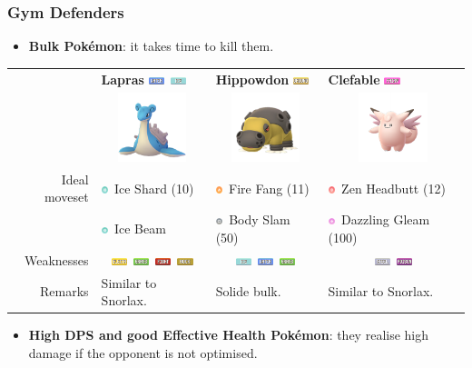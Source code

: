 \documentclass[12pt]{beamer}
\newcommand{\fightingfull}{\includegraphics[height=0.2cm]{../../images/type/full/Fighting.png}}
\newcommand{\electricfull}{\includegraphics[height=0.2cm]{../../images/type/full/Electric.png}}
\newcommand{\fairyfull}{\includegraphics[height=0.2cm]{../../images/type/full/Fairy.png}}
\newcommand{\grassfull}{\includegraphics[height=0.2cm]{../../images/type/full/Grass.png}}
\newcommand{\groundfull}{\includegraphics[height=0.2cm]{../../images/type/full/Ground.png}}
\newcommand{\icefull}{\includegraphics[height=0.2cm]{../../images/type/full/Ice.png}}
\newcommand{\rockfull}{\includegraphics[height=0.2cm]{../../images/type/full/Rock.png}}
\newcommand{\waterfull}{\includegraphics[height=0.2cm]{../../images/type/full/Water.png}}
\newcommand{\poisonfull}{\includegraphics[height=0.2cm]{../../images/type/full/Poison.png}}
\newcommand{\steelfull}{\includegraphics[height=0.2cm]{../../images/type/full/Steel.png}}
\newcommand{\psysimp}{\includegraphics[height=0.2cm]{../../images/type/simplified/psy.png}}
\newcommand{\icesimp}{\includegraphics[height=0.2cm]{../../images/type/simplified/ice.png}}
\newcommand{\firesimp}{\includegraphics[height=0.2cm]{../../images/type/simplified/fire.png}}
\newcommand{\fairysimp}{\includegraphics[height=0.2cm]{../../images/type/simplified/fairy.png}}
\newcommand{\normalsimp}{\includegraphics[height=0.2cm]{../../images/type/simplified/normal.png}}
\begin{document}
\begin{frame}
\frametitle{Gym Defenders}

\begin{block}{}
\begin{footnotesize}

\begin{itemize}
\item \textbf{Bulk Pok\'emon}: it takes time to kill them. 
\end{itemize}

\begin{tabular}{rp{3.2cm}p{3.2cm}p{3.2cm}}
& \textbf{Lapras} \hfill \waterfull~\icefull & \textbf{Hippowdon} \hfill \groundfull &  \textbf{Clefable} \hfill \fairyfull  \\ 
&\multicolumn{1}{c}{\includegraphics[width=2cm]{../../images/pokemon/Lapras}} &
\multicolumn{1}{c}{\includegraphics[width=2cm]{../../images/pokemon/Hippowdon}} &
\multicolumn{1}{c}{\includegraphics[width=2cm]{../../images/pokemon/Clefable}} \\ \hline
Ideal moveset & \icesimp~Ice Shard (10) & \firesimp~Fire Fang (11)&  \psysimp~Zen Headbutt (12)  \\
& \icesimp~Ice Beam & \normalsimp~Body Slam (50)&   \fairysimp~Dazzling Gleam (100) \\ \hline
Weaknesses &  \multicolumn{1}{c}{\electricfull~\grassfull~\fightingfull~\rockfull} & \multicolumn{1}{c}{\icefull~\waterfull~\grassfull} & \multicolumn{1}{c}{\steelfull~\poisonfull} \\ \hline
Remarks &  Similar to Snorlax.   & Solide bulk. & Similar to Snorlax.  \\
\end{tabular}



\begin{itemize}
  \item \textbf{High DPS and good Effective Health Pok\'emon}: they realise high damage if the opponent is not optimised. 
\end{itemize}


\end{footnotesize}
\end{block}
\end{frame}
\end{document}
